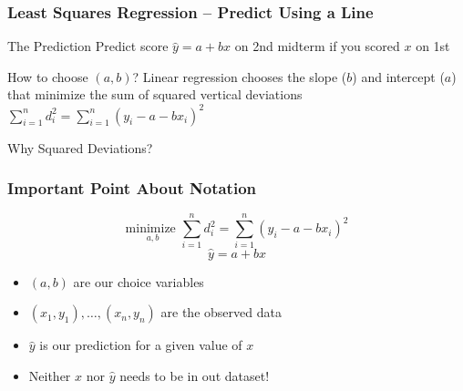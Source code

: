 %
%
%
\begin{frame}
\frametitle{Least Squares Regression -- Predict Using a Line}

\begin{block}{The Prediction}
Predict score $\hat{y} = a + b x$ on 2nd midterm if you scored $x$ on 1st
\end{block}

\begin{block}{How to choose $(a,b)$?}
  Linear regression chooses the slope ($b$) and intercept ($a$) that \alert{minimize the sum of squared vertical deviations}
$\displaystyle\sum_{i = 1}^n d_i^2 = \sum_{i=1}^n (y_i - a - b x_i)^2$
\end{block}

\begin{block}{Why Squared Deviations?}
\end{block}
\end{frame}
\begin{frame}
	\frametitle{Important Point About Notation}
  $$\boxed{\underset{a,b}{\mbox{minimize }}\sum_{i = 1}^n d_i^2 = \sum_{i=1}^n (y_i - a - b x_i)^2}$$
			$$\boxed{\hat{y} = a + bx}$$
		\begin{itemize}
      \item $(a,b)$ are our \alert{choice variables}
		\item $(x_1, y_1), \dots, (x_n, y_n)$ are the \alert{observed data}
		\item $\widehat{y}$ is our \alert{prediction} for a given value of $x$
		\item Neither $x$ nor $\widehat{y}$ needs to be in out dataset!
	\end{itemize}
\end{frame}
